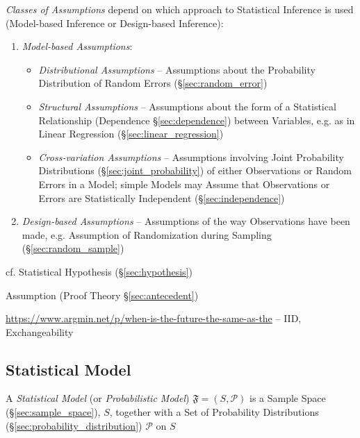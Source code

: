 \emph{Classes of Assumptions} depend on which approach to Statistical Inference
is used (Model-based Inference or Design-based Inference):
\begin{enumerate}
  \item \emph{Model-based Assumptions}:
    \begin{itemize}
      \item \emph{Distributional Assumptions} -- Assumptions about the
        Probability Distribution of Random Errors (\S\ref{sec:random_error})
      \item \emph{Structural Assumptions} -- Assumptions about the form of a
        Statistical Relationship (Dependence \S\ref{sec:dependence}) between
        Variables, e.g. as in Linear Regression (\S\ref{sec:linear_regression})
      \item \emph{Cross-variation Assumptions} -- Assumptions involving Joint
        Probability Distributions (\S\ref{sec:joint_probability}) of either
        Observations or Random Errors in a Model; simple Models may Assume that
        Observations or Errors are Statistically Independent
        (\S\ref{sec:independence})
    \end{itemize}
  \item \emph{Design-based Assumptions} -- Assumptions of the way Observations
    have been made, e.g. Assumption of Randomization during Sampling
    (\S\ref{sec:random_sample})
\end{enumerate}

cf. Statistical Hypothesis (\S\ref{sec:hypothesis})

\fist Assumption (Proof Theory \S\ref{sec:antecedent})

\url{https://www.argmin.net/p/when-is-the-future-the-same-as-the} -- IID,
Exchangeability



\subsection{Statistical Model}\label{sec:statistical_model}

A \emph{Statistical Model} (or \emph{Probabilistic Model})
$\mathfrak{F} = (S,\mathcal{P})$ is a Sample Space (\S\ref{sec:sample_space}),
$S$, together with a Set of Probability Distributions
(\S\ref{sec:probability_distribution}) $\mathcal{P}$ on $S$

